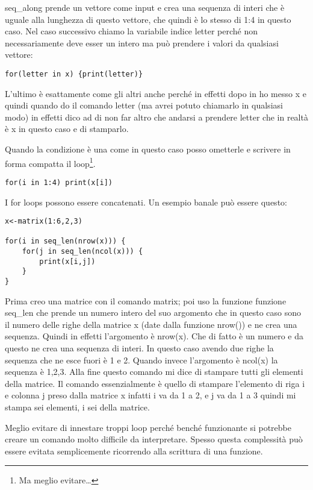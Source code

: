 seq\_along prende un vettore come input e crea una sequenza di interi
che è uguale alla lunghezza di questo vettore, che quindi è lo stesso di 1:4 in questo caso.
Nel caso successivo chiamo la variabile indice letter perché non necessariamente deve esser un intero ma può prendere i valori da qualsiasi vettore:

\begin{lstlisting}
for(letter in x) {print(letter)}
\end{lstlisting}

L'ultimo è esattamente come gli altri anche perché in effetti dopo in ho messo x e quindi quando do il comando letter (ma avrei potuto chiamarlo in qualsiasi modo) in effetti dico ad \erre di non far altro che andarsi a prendere letter che in realtà è x in questo caso e di stamparlo.

Quando la condizione è una come in questo caso posso ometterle e scrivere in forma compatta il loop\footnote{Ma meglio evitare\dots}.

\begin{lstlisting}
for(i in 1:4) print(x[i])
\end{lstlisting}

I for loops possono essere concatenati.
Un esempio banale può essere questo:

\begin{lstlisting}
x<-matrix(1:6,2,3)

for(i in seq_len(nrow(x))) {
	for(j in seq_len(ncol(x))) {
		print(x[i,j])
	}
}
\end{lstlisting}

Prima creo una matrice con il comando matrix; poi uso la funzione funzione seq\_len che prende un numero intero del suo argomento che in questo caso sono il numero delle righe della matrice x (date dalla funzione nrow()) e ne crea una sequenza. Quindi in effetti l'argomento è nrow(x). Che di fatto è un numero e da questo ne crea
una sequenza di interi. In questo caso avendo due righe la sequenza che ne esce fuori è
1 e 2.
Quando invece l'argomento è ncol(x) la sequenza è 1,2,3.
Alla fine questo comando mi dice di stampare tutti gli elementi della matrice.
Il comando essenzialmente è quello di stampare l'elemento di riga i e colonna j preso
dalla matrice x infatti i va da 1 a 2, e j va da 1 a 3 quindi mi stampa sei elementi, i sei della matrice.

Meglio evitare di innestare troppi loop perché benché funzionante si potrebbe creare un comando molto difficile da interpretare. Spesso questa complessità può essere evitata semplicemente ricorrendo alla scrittura di una funzione.

